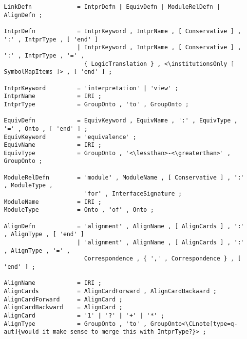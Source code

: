 \documentclass[%
\ifpretendfinal
final%
\else
draft%
\fi,
a4paper,
wd]{isov2}
\makeatletter
\newcommand*\CommentAuthor{}
\renewcommand*\CommentAuthor{#1}}
\newcommand*\CommentDate{}
\renewcommand*\CommentDate{#1}}
\newcommand*\CommentId{}
\renewcommand*\CommentId{#1}}
\newcommand*\CommentType{}
\renewcommand*\CommentType{#1}}
\newcommand*{\SetCommentColorByType}[1]{%
\edef\localType{{#1}}%
\expandafter\ifstrequal\localType{q-aut}{\colorlet{CommentColor}{red}}{%
\expandafter\ifstrequal\localType{q-all}{\colorlet{CommentColor}{orange}}{%
\expandafter\ifstrequal\localType{todo}{\colorlet{CommentColor}{orange}}{%
\expandafter\ifstrequal\localType{fyi}{\colorlet{CommentColor}{lightgray}}{%
\colorlet{CommentColor}{yellow}}}}}}
\newcommand*{\SetCommentPrefixByType}[1]{%
\edef\localType{{#1}}%
\expandafter\@ifmtarg\localType{%
\edef\CommentPrefix{}%
}{%
\caseupper[q]{#1}%
\edef\CommentPrefix{\thestring: }%
}}
\newcommand*{\initComment}[1]{%
\setkeys{Comment}{#1}%
\SetCommentColorByType{\CommentType}%
\relax%
\SetCommentPrefixByType{\CommentType}%
\relax%
}
\newcommand*{\todonote}[2][]{%
\initComment{#1}%
\pdfcomment[author=\CommentAuthor,color=CommentColor,date=\CommentDate,id=\CommentId]{%
\CommentPrefix
#2}}
\newcommand*{\todonote}[2][]{%
\initComment{#1}%
\ednote{\CommentPrefix #2}}
\newcommand*{\CLnote}[2][author=Christoph Lange]{%
\todonote[author=Christoph Lange,#1]{#2}}
\newcommand*{\institutionsOnly}{\bfseries\itshape}
\makeatother
\begin{document}

\newcommand*{\lessthan}{<}
\newcommand*{\greaterthan}{>}
\begin{lstlisting}[language=ebnf,escapeinside={<>}]
LinkDefn             = IntprDefn | EquivDefn | ModuleRelDefn | AlignDefn ;

IntprDefn            = IntprKeyword , IntprName , [ Conservative ] , ':' , IntprType , [ 'end' ]
                     | IntprKeyword , IntprName , [ Conservative ] , ':' , IntprType , '=' ,
                       { LogicTranslation } , <\institutionsOnly [ SymbolMapItems ]> , [ 'end' ] ;

IntprKeyword         = 'interpretation' | 'view' ;
IntprName            = IRI ;
IntprType            = GroupOnto , 'to' , GroupOnto ;

EquivDefn            = EquivKeyword , EquivName , ':' , EquivType , '=' , Onto , [ 'end' ] ;
EquivKeyword         = 'equivalence' ;
EquivName            = IRI ;
EquivType            = GroupOnto , '<\lessthan>-<\greaterthan>' , GroupOnto ;

ModuleRelDefn        = 'module' , ModuleName , [ Conservative ] , ':' , ModuleType ,
                       'for' , InterfaceSignature ;
ModuleName           = IRI ;
ModuleType           = Onto , 'of' , Onto ;

AlignDefn            = 'alignment' , AlignName , [ AlignCards ] , ':' , AlignType , [ 'end' ]
                     | 'alignment' , AlignName , [ AlignCards ] , ':' , AlignType , '=' ,
                       Correspondence , { ',' , Correspondence } , [ 'end' ] ;

AlignName            = IRI ;
AlignCards           = AlignCardForward , AlignCardBackward ;
AlignCardForward     = AlignCard ;
AlignCardBackward    = AlignCard ;
AlignCard            = '1' | '?' | '+' | '*' ;
AlignType            = GroupOnto , 'to' , GroupOnto<\CLnote[type=q-aut]{would it make sense to merge this with IntprType?}> ;


\end{lstlisting}
\end{document}
